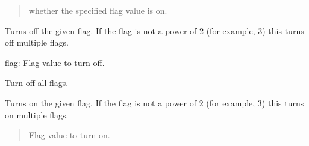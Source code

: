 \documentclass[letterpaper,10pt,english]{sphinxmanual}
\begin{document}
\begin{fulllineitems}
\begin{fulllineitems}
\begin{quote}
\begin{description}
\sphinxAtStartPar
whether the specified flag value is on.

\end{description}\end{quote}

\end{fulllineitems}


\begin{fulllineitems}
\label{\detokenize{apache_commons_validator_python.util:apache_commons_validator_python.util.flags.Flags.turn_off}}
\pysigstartsignatures
{}
\pysigstopsignatures
\sphinxAtStartPar
Turns off the given flag. If the flag is not a power of 2 (for example, 3)
this turns off multiple flags.
\begin{description}
\sphinxAtStartPar
flag: Flag value to turn off.

\end{description}

\end{fulllineitems}


\begin{fulllineitems}
\label{\detokenize{apache_commons_validator_python.util:apache_commons_validator_python.util.flags.Flags.turn_off_all}}
\pysigstartsignatures
{}
\pysigstopsignatures
\sphinxAtStartPar
Turn off all flags.

\end{fulllineitems}


\begin{fulllineitems}
\label{\detokenize{apache_commons_validator_python.util:apache_commons_validator_python.util.flags.Flags.turn_on}}
\pysigstartsignatures
{}
\pysigstopsignatures
\sphinxAtStartPar
Turns on the given flag. If the flag is not a power of 2 (for example, 3)
this turns on multiple flags.
\begin{quote}\begin{description}
\sphinxAtStartPar
{} \textendash{} Flag value to turn on.


\end{description}
\end{quote}
\end{fulllineitems}
\end{fulllineitems}
\end{document}
